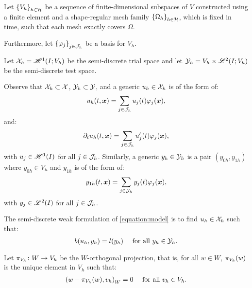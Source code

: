 Let $\left\{ V_h \right\}_{h \in \mathcal{H}}$ be a sequence of finite-dimensional subspaces of $V$ constructed using a finite element and a shape-regular mesh family $\left\{ \Omega_{h} \right\}_{h \in \mathcal{H}}$, which is fixed in time, such that each mesh exactly covers $\Omega$.

Furthermore, let $\left\{ \varphi_j \right\}_{j \in \mathcal{J}_h}$ be a basis for $V_h$.

\begin{definition}
    Let $\mathcal{X}_h = \mathscr{H}^{1}(I; V_h)$ be the semi-discrete trial space and let $\mathcal{Y}_h = V_h \times \mathscr{L}^{2}(I; V_h)$ be the semi-discrete test space.
\end{definition}

Observe that $\mathcal{X}_h \subset \mathcal{X}$, $\mathcal{Y}_h \subset \mathcal{Y}$, and a generic $u_h \in \mathcal{X}_h$ is of the form of:
\begin{align}
    u_h(t, \bm{x}) = \sum_{j \in \mathcal{J}_h} u_j(t) \varphi_j(\bm{x}),
\end{align}
and:
\begin{align}
    \partial_t u_h(t, \bm{x}) = \sum_{j \in \mathcal{J}_h} u_j^{\prime}(t) \varphi_j(\bm{x}),
\end{align}
with $u_j \in \mathscr{H}^{1}(I)$ for all $j \in \mathcal{J}_h$. Similarly, a generic $y_h \in \mathcal{Y}_h$ is a pair $(y_{0h}, y_{1h})$ where $y_{0h} \in V_h$ and $y_{1h}$ is of the form of:
\begin{align}
    y_{1h}(t, \bm{x}) = \sum_{j \in \mathcal{J}_h} y_j(t) \varphi_j(\bm{x}),
\end{align}
with $y_j \in \mathscr{L}^{2}(I)$ for all $j \in \mathcal{J}_h$.

\begin{definition}
    The semi-discrete weak formulation of \cref{equation:model} is to find $u_h \in \mathcal{X}_h$ such that:
    \begin{align} \label{equation:weak_h1}
        b(u_h, y_h) &= l(y_h) &\text{ for all } y_h \in \mathcal{Y}_h.
    \end{align}
\end{definition}

\begin{definition}[$\ProjectionOnto{V_h}$]
    Let $\pi_{V_h} \colon W \rightarrow V_h$ be the $W$-orthogonal projection, that is, for all $w \in W$, $\pi_{V_h}(w)$ is the unique element in $V_h$ such that:
    \begin{align}
        \left( w - \pi_{V_h}(w), v_h \right)_W &= 0 &\text{ for all } v_h \in V_h.
    \end{align}
\end{definition}

